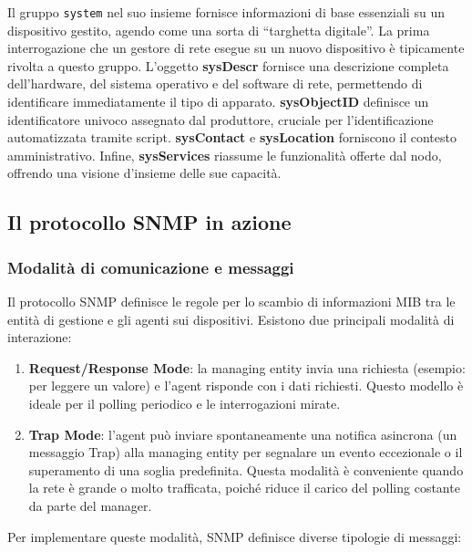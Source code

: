 Il gruppo \texttt{system} nel suo insieme fornisce informazioni di base
essenziali su un dispositivo gestito, agendo come una sorta di ``targhetta
digitale''. La prima interrogazione che un gestore di rete esegue su un nuovo
dispositivo è tipicamente rivolta a questo gruppo. L'oggetto \textbf{sysDescr}
fornisce una descrizione completa dell'hardware, del sistema operativo e del
software di rete, permettendo di identificare immediatamente il tipo di
apparato. \textbf{sysObjectID} definisce un identificatore univoco assegnato
dal produttore, cruciale per l'identificazione automatizzata tramite script.
\textbf{sysContact} e \textbf{sysLocation} forniscono il contesto
amministrativo. Infine, \textbf{sysServices} riassume le funzionalità offerte
dal nodo, offrendo una visione d'insieme delle sue capacità.

\subsection{Il protocollo SNMP in azione}

\subsubsection{Modalità di comunicazione e messaggi}

Il protocollo SNMP definisce le regole per lo scambio di informazioni MIB tra
le entità di gestione e gli agenti sui dispositivi. Esistono due principali
modalità di interazione:

\begin{enumerate}
\item \textbf{Request/Response Mode}: la managing entity invia una richiesta
(esempio: per leggere un valore) e l'agent risponde con i dati richiesti.
Questo modello è ideale per il polling periodico e le interrogazioni mirate.
\item \textbf{Trap Mode}: l'agent può inviare spontaneamente una notifica
asincrona (un messaggio Trap) alla managing entity per segnalare un evento
eccezionale o il superamento di una soglia predefinita. Questa modalità è
conveniente quando la rete è grande o molto trafficata, poiché riduce il
carico del polling costante da parte del manager.
\end{enumerate}

Per implementare queste modalità, SNMP definisce diverse tipologie di messaggi:


